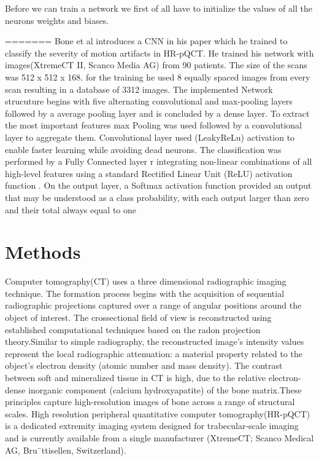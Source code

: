 \documentclass[
a4paper, 
12pt,
grayscalebody, %
abstract=on,
twoside, BCOR10mm, 12pt, DIV13,headinclude, footexclude, final, abstracton, openright
]{ibireprt}
\numberwithin{equation}{chapter}
\numberwithin{table}{chapter}
\numberwithin{figure}{chapter}
\numberwithin{algorithm}{chapter}
\numberwithin{example}{chapter}
\numberwithin{example}{chapter}
\begin{document}
Before we can train a network we first of all have to initialize the values of all the neurons weights and biases.  


=======
Bone et al introduces a CNN in his paper which he trained to classify the severity of motion artifacts in HR-pQCT. He trained his network with images(XtremeCT II, Scanco Media AG) from 90 patients. The size of the scans was 512 x 512 x 168. for the training he used 8 equally spaced images from every scan  resulting in a database of 3312 images.
The implemented Network strucuture begins with five alternating convolutional and max-pooling layers followed by a average pooling layer and is concluded by a dense layer. To extract the most important features max Pooling was used followed by a convolutional layer to aggregate them. Convolutional layer used (LeakyReLu) activation to enable faster learning while avoiding dead neurons.
 The classification was performed by a Fully Connected layer r integrating non-linear combinations of all high-level features using a standard Rectified Linear
Unit (ReLU) activation function . On the output layer, a Softmax activation function provided an output that may be understood as a class probability, with each output larger than zero and their total always equal to one

\chapter{Methods}
Computer tomography(CT) uses a three dimensional radiographic imaging technique. The formation process begins with the acquisition of sequential radiographic projections captured over a range of angular positions around the object of interest. The crossectional field of view is reconstructed using established computational techniques based on the radon projection theory\cite{article}.Similar to simple radiography, the reconstructed image’s intensity values represent the local radiographic attenuation: a material property related to the object’s electron density (atomic number and mass density). The contrast between soft and mineralized tissue in CT is high, due to the relative electron-dense inorganic component (calcium hydroxyapatite) of the bone matrix.These principles capture high-resolution images of bone
across a range of structural scales. %
High resolution peripheral quantitative computer tomography(HR-pQCT) is a  dedicated extremity imaging system designed for trabecular-scale imaging and is currently available from a single manufacturer (XtremeCT; Scanco Medical AG,
Bru¨ttisellen, Switzerland). 
\end{document}
